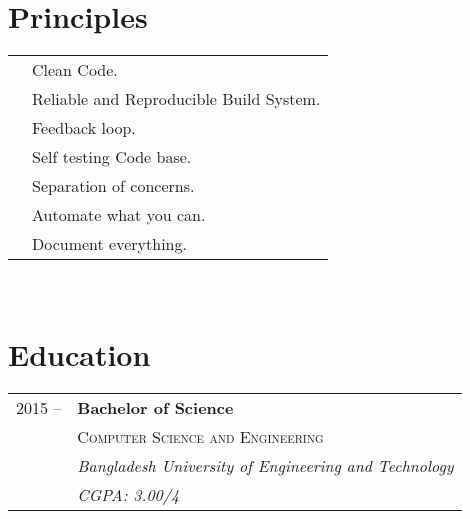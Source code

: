 \documentclass[10pt]{article} %
\begin{document}
{\begin{minipage}[t]{0.44\textwidth}
%
\section{Principles} 

\begin{tabular}{rl}
	\textsc{}
	& Clean Code. \\
	& Reliable and Reproducible Build System.\\
	& Feedback loop. \\
	& Self testing Code base.\\
	& Separation of concerns. \\
	& Automate what you can. \\
	& Document everything. \\
\end{tabular}\\[10pt]



\section{Education} 

\begin{tabular}{rl} %


2015 --  & \textbf{Bachelor of Science} \\ 
& \textsc{Computer Science and Engineering} \\ 
& \textit{Bangladesh University of Engineering and Technology}\\
& \textit{CGPA: 3.00/4}\\
	 


\end{tabular}\\[10pt]



\end{minipage}}
\end{document}
